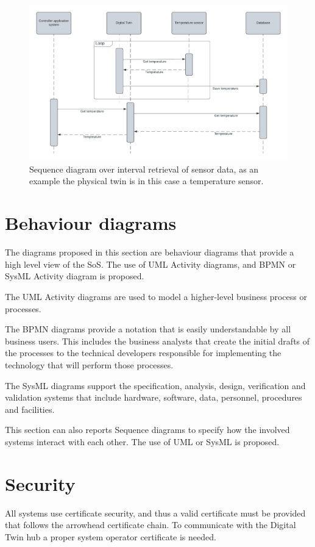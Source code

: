 \documentclass{article}
\begin{document}
\begin{figure}[H]
    \centering
    \includegraphics[width=\textwidth,height=\textheight,keepaspectratio]{./figures/Sensor-Interval-Sequence.png}
    \caption{Sequence diagram over interval retrieval of sensor data, as an example the physical twin is in this case a temperature sensor.}
    \label{fig:sensor-interval-sequence}
\end{figure}

\newpage

\section{Behaviour diagrams}
The diagrams proposed in this section are behaviour diagrams that provide a high level view of the SoS. The use of UML Activity diagrams, and BPMN or SysML Activity diagram is proposed.

The UML Activity diagrams are used to model a higher-level business process or processes.\ \ 

The BPMN diagrams provide a notation that is easily understandable by all business users. This includes the business analysts that create the initial drafts of the processes to the technical developers responsible for implementing the technology that will perform those processes.

The SysML diagrams support the specification, analysis, design, verification and validation systems that include hardware, software, data, personnel, procedures and facilities.

This section can also reports Sequence diagrams to specify how the involved systems interact with each other. The use of UML or SysML is proposed.

\section[Security ]{Security }

All systems use certificate security, and thus a valid certificate must be provided that follows the arrowhead certificate chain. To communicate with the Digital Twin hub a proper system operator certificate is needed.
\end{document}
